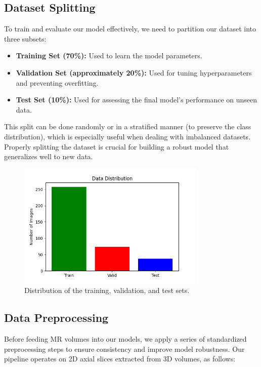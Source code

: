 \subsection{Dataset Splitting}
To train and evaluate our model effectively, we need to partition our dataset into three subsets:
\begin{itemize}
  \item \textbf{Training Set (70\%):} Used to learn the model parameters.
  \item \textbf{Validation Set (approximately 20\%):} Used for tuning hyperparameters and preventing overfitting.
  \item \textbf{Test Set (10\%):} Used for assessing the final model’s performance on unseen data.
\end{itemize}
This split can be done randomly or in a stratified manner (to preserve the class distribution), which is especially useful when dealing with imbalanced datasets. Properly splitting the dataset is crucial for building a robust model that generalizes well to new data.
\begin{figure}[H]
  \centering
  \includegraphics[width=0.8\textwidth]{Images/Chapter3/data_distribution.png}
  \caption{Distribution of the training, validation, and test sets.}
  \label{fig:data_distribution}
\end{figure}


\subsection{Data Preprocessing}
\label{sec:contribution-preprocessing}

Before feeding MR volumes into our models, we apply a series of standardized preprocessing steps to ensure consistency and improve model robustness. Our pipeline operates on 2D axial slices extracted from 3D volumes, as follows:

